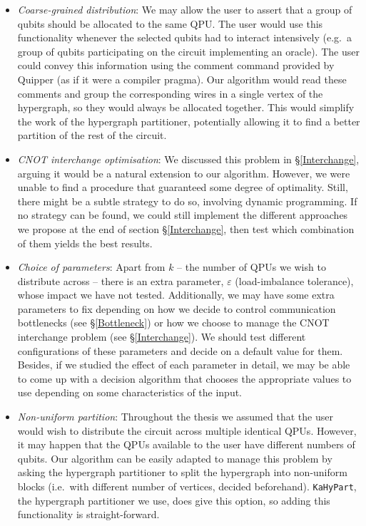 \begin{itemize}
  \item \textit{Coarse-grained distribution}: We may allow the user to assert that a group of qubits should be allocated to the same QPU. The user would use this functionality whenever the selected qubits had to interact intensively (e.g.\ a group of qubits participating on the circuit implementing an oracle). The user could convey this information using the comment command provided by Quipper (as if it were a compiler pragma). Our algorithm would read these comments and group the corresponding wires in a single vertex of the hypergraph, so they would always be allocated together. This would simplify the work of the hypergraph partitioner, potentially allowing it to find a better partition of the rest of the circuit.
  \item \textit{CNOT interchange optimisation}: We discussed this problem in \S\ref{Interchange}, arguing it would be a natural extension to our algorithm. However, we were unable to find a procedure that guaranteed some degree of optimality. Still, there might be a subtle strategy to do so, involving dynamic programming. If no strategy can be found, we could still implement the different approaches we propose at the end of section \S\ref{Interchange}, then test which combination of them yields the best results.
  \item \textit{Choice of parameters}: Apart from \(k\) -- the number of QPUs we wish to distribute across -- there is an extra parameter, \(\varepsilon\) (load-imbalance tolerance), whose impact we have not tested. Additionally, we may have some extra parameters to fix depending on how we decide to control communication bottlenecks (see \S\ref{Bottleneck}) or how we choose to manage the CNOT interchange problem (see \S\ref{Interchange}). We should test different configurations of these parameters and decide on a default value for them. Besides, if we studied the effect of each parameter in detail, we may be able to come up with a decision algorithm that chooses the appropriate values to use depending on some characteristics of the input.
  \item \textit{Non-uniform partition}: Throughout the thesis we assumed that the user would wish to distribute the circuit across multiple identical QPUs. However, it may happen that the QPUs available to the user have different numbers of qubits. Our algorithm can be easily adapted to manage this problem by asking the hypergraph partitioner to split the hypergraph into non-uniform blocks (i.e.\ with different number of vertices, decided beforehand). \texttt{KaHyPart}, the hypergraph partitioner we use, does give this option, so adding this functionality is straight-forward.

\end{itemize}
